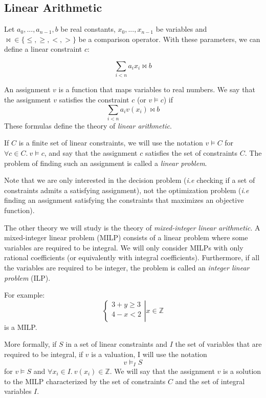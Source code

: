 \documentclass{article}
\newcommand{\ints}{\mathbb{Z}}
\begin{document}
\subsection{Linear Arithmetic}

Let $a_0, ..., a_{n-1}, b$ be real constants, $x_0, ..., x_{n-1}$ be
variables and ${\bowtie} \in \{\leqslant,\geqslant,<,>\}$ be a comparison
operator. With these parameters, we can define a linear constraint $c$:

$$\sum_{i < n} a_i x_i \bowtie b$$

An assignment $v$ is a function that maps variables to real numbers.
We say that the assignment $v$ satisfies the constraint $c$ (or $v \vDash c$)
if $$\sum_{i < n} a_i v(x_i) \bowtie b$$
These formulas define the theory of \textit{linear arithmetic}.

If $C$ is a finite set of linear constraints,
we will use the notation $v \vDash C$ for $\forall c \in C.~v \vDash c$, and
say that the assignment $c$ satisfies the set of constraints $C$. The
problem of finding such an assignment is called a
\textit{linear problem}.

Note that we are only interested in the decision problem (\textit{i.e} checking
if a set of constraints admits a satisfying assignment), not the optimization
problem (\textit{i.e} finding an assignment satisfying the constraints that
maximizes an objective function). 

The other theory we will study is the theory of \textit{mixed-integer linear
arithmetic}. A mixed-integer linear problem (MILP) consists of a linear
problem where some variables are required to be integral. We will only consider
MILPs with only rational coefficients (or equivalently with integral
coefficients). Furthermore, if all the variables are required to be
integer, the problem is called an \textit{integer linear problem} (ILP).

For example:
\begin{displaymath}
  \left\{
  \begin{array}{l}
    3 + y \geqslant 3 \\
    4 - x < 2 \\
  \end{array}
  \right|
  x \in \ints
\end{displaymath}
is a MILP.

More formally, if $S$ in a set of linear constraints and $I$ the set of
variables that are required to be integral, if $v$ is a valuation, I will use
the notation $$v \vDash_I S$$ for $v \vDash S$ and
$\forall x_i \in I.~v(x_i) \in \ints$. We will say that the assignment $v$
is a solution to the MILP characterized by the set of constraints $C$ and the
set of integral variables $I$.
\end{document}
